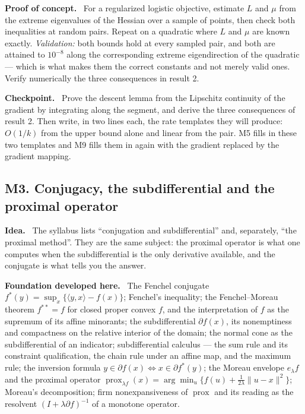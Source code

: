 \documentclass[11pt,a4paper]{article}
\newcommand{\mpart}[1]{\smallskip\noindent\textbf{#1}\ \ignorespaces}
\newcommand{\prox}{\operatorname{prox}}
\begin{document}
\mpart{Proof of concept.} For a regularized logistic objective, estimate $L$ and $\mu$ from
the extreme eigenvalues of the Hessian over a sample of points, then check both inequalities
at random pairs. Repeat on a quadratic where $L$ and $\mu$ are known exactly.
\emph{Validation:} both bounds hold at every sampled pair, and both are attained to $10^{-8}$
along the corresponding extreme eigendirection of the quadratic --- which is what makes them
the correct constants and not merely valid ones. Verify numerically the three consequences in
result 2.

\mpart{Checkpoint.} Prove the descent lemma from the Lipschitz continuity of the gradient by
integrating along the segment, and derive the three consequences of result 2. Then write, in
two lines each, the rate templates they will produce: $O(1/k)$ from the upper bound alone and
linear from the pair. M5 fills in these two templates and M9 fills them in again with the
gradient replaced by the gradient mapping.

\subsection{M3. Conjugacy, the subdifferential and the proximal operator}

\mpart{Idea.} The syllabus lists ``conjugation and subdifferential'' and, separately, ``the
proximal method''. They are the same subject: the proximal operator is what one computes when
the subdifferential is the only derivative available, and the conjugate is what tells you the
answer.

\mpart{Foundation developed here.} The Fenchel conjugate $f^*(y)=\sup_x\{\langle y,x\rangle -
f(x)\}$; Fenchel's inequality; the Fenchel--Moreau theorem $f^{**}=f$ for closed proper
convex $f$, and the interpretation of $f$ as the supremum of its affine minorants; the
subdifferential $\partial f(x)$, its nonemptiness and compactness on the relative interior of
the domain; the normal cone as the subdifferential of an indicator; subdifferential calculus
--- the sum rule and its constraint qualification, the chain rule under an affine map, and
the maximum rule; the inversion formula $y \in \partial f(x) \iff x \in \partial f^*(y)$; the
Moreau envelope $e_\lambda f$ and the proximal operator
$\prox_{\lambda f}(x)=\arg\min_u\{f(u)+\tfrac1{2\lambda}\|u-x\|^2\}$; Moreau's decomposition;
firm nonexpansiveness of $\prox$ and its reading as the resolvent $(I+\lambda\partial f)^{-1}$
of a monotone operator.
\end{document}
